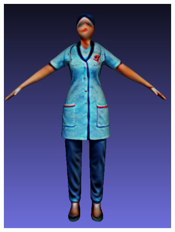 \begin{figure}[H]
\begin{subfigure}[b]{0.232\textwidth}
        \includegraphics[width=\textwidth]{etc/bias/bias_nurse_genie_4.png}
        \caption{}
    \end{subfigure}


\end{figure}
